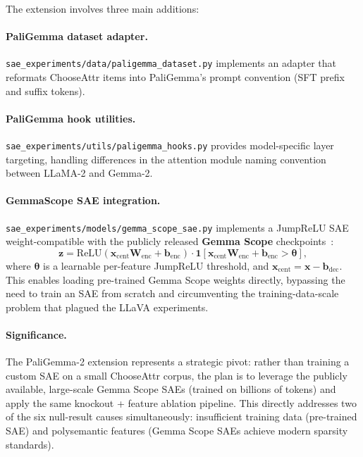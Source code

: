 \documentclass[11pt,a4paper]{article}
\begin{document}
The extension involves three main additions:

\paragraph{PaliGemma dataset adapter.}
\texttt{sae\_experiments/data/paligemma\_dataset.py} implements an adapter that reformats
ChooseAttr items into PaliGemma's prompt convention (SFT prefix and suffix tokens).

\paragraph{PaliGemma hook utilities.}
\texttt{sae\_experiments/utils/paligemma\_hooks.py} provides model-specific layer targeting,
handling differences in the attention module naming convention between LLaMA-2 and Gemma-2.

\paragraph{GemmaScope SAE integration.}
\texttt{sae\_experiments/models/gemma\_scope\_sae.py} implements a JumpReLU SAE
weight-compatible with the publicly released \textbf{Gemma Scope} checkpoints~\citep{gemmascope2024}:
\begin{equation}
  \mathbf{z} = \mathrm{ReLU}(\mathbf{x}_{\mathrm{cent}} \mathbf{W}_{\mathrm{enc}} + \mathbf{b}_{\mathrm{enc}})
    \cdot \mathbf{1}[\mathbf{x}_{\mathrm{cent}} \mathbf{W}_{\mathrm{enc}} + \mathbf{b}_{\mathrm{enc}} > \boldsymbol{\theta}],
\end{equation}
where $\boldsymbol{\theta}$ is a learnable per-feature JumpReLU threshold, and
$\mathbf{x}_{\mathrm{cent}} = \mathbf{x} - \mathbf{b}_{\mathrm{dec}}$.
This enables loading pre-trained Gemma Scope weights directly, bypassing the need to train an SAE
from scratch and circumventing the training-data-scale problem that plagued the LLaVA experiments.

\paragraph{Significance.}
The PaliGemma-2 extension represents a strategic pivot: rather than training a custom SAE on a
small ChooseAttr corpus, the plan is to leverage the publicly available, large-scale Gemma Scope
SAEs (trained on billions of tokens) and apply the same knockout + feature ablation pipeline.
This directly addresses two of the six null-result causes simultaneously:
insufficient training data (pre-trained SAE) and polysemantic features (Gemma Scope SAEs achieve
modern sparsity standards).
\end{document}
